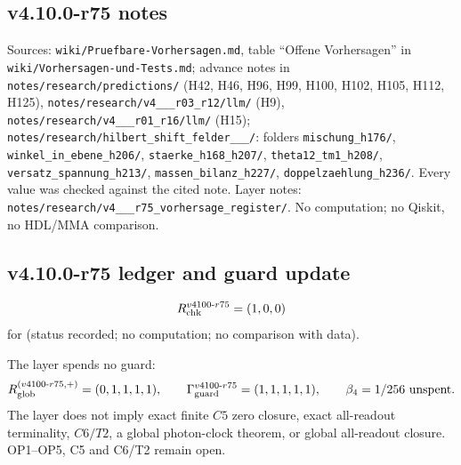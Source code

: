 \subsection*{v4.10.0-r75 notes}
\label{subsec:v4100-r75-notes}

{\raggedright
Sources: \texttt{wiki/\allowbreak Pruefbare-Vorhersagen.md}, table ``Offene Vorhersagen'' in \texttt{wiki/\allowbreak Vorhersagen-und-Tests.md};
advance notes in \texttt{notes/\allowbreak research/\allowbreak predictions/} (H42, H46, H96, H99, H100, H102, H105, H112, H125),
\texttt{notes/\allowbreak research/\allowbreak v4\_\_\_\allowbreak r03\_\allowbreak r12/\allowbreak llm/} (H9),
\texttt{notes/\allowbreak research/\allowbreak v4\_\_\_\allowbreak r01\_\allowbreak r16/\allowbreak llm/} (H15);
\texttt{notes/\allowbreak research/\allowbreak hilbert\_\allowbreak shift\_\allowbreak felder\_\_\_/}: folders
\texttt{mischung\_\allowbreak h176/}, \texttt{winkel\_\allowbreak in\_\allowbreak ebene\_\allowbreak h206/}, \texttt{staerke\_\allowbreak h168\_\allowbreak h207/},
\texttt{theta12\_\allowbreak tm1\_\allowbreak h208/}, \texttt{versatz\_\allowbreak spannung\_\allowbreak h213/}, \texttt{massen\_\allowbreak bilanz\_\allowbreak h227/},
\texttt{doppelzaehlung\_\allowbreak h236/}.  Every value was checked against the cited note.
Layer notes: \texttt{notes/\allowbreak research/\allowbreak v4\_\_\_\allowbreak r75\_\allowbreak vorhersage\_\allowbreak register/}.
No computation; no Qiskit, no HDL/MMA comparison.
\par}

\subsection*{v4.10.0-r75 ledger and guard update}
\label{subsec:v4100-r75-ledger-guard}

\[
R_{\rm chk}^{v4100\text{-}r75}=(1,0,0)
\]
for (status recorded; no computation; no comparison with data).

The layer spends no guard:
\[
R_{\rm glob}^{(v4100\text{-}r75,+)}=(0,1,1,1,1),
\qquad
\Gamma_{\rm guard}^{v4100\text{-}r75}=(1,1,1,1,1),
\qquad
\beta_4=1/256\ \text{unspent}.
\]
The layer does not imply exact finite \(C5\) zero closure, exact all-readout terminality, \(C6/T2\), a global photon-clock theorem,
or global all-readout closure.  OP1--OP5, C5 and C6/T2 remain open.

